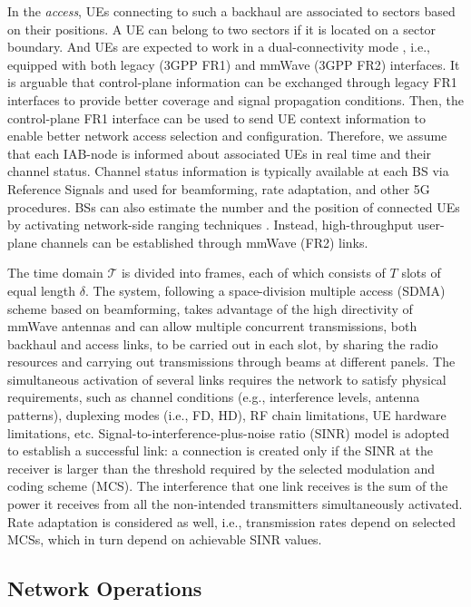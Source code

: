 In the \textit{access}, UEs connecting to such a backhaul are associated to sectors based on their positions. A UE can belong to two sectors if it is located on a sector boundary. And UEs are expected to work in a dual-connectivity mode \cite{polese2017improved}, i.e., equipped with both legacy (3GPP FR1) and mmWave (3GPP FR2) interfaces. It is arguable that control-plane information can be exchanged through legacy FR1 interfaces to provide better coverage and signal propagation conditions.
Then, the control-plane FR1 interface can be used to send UE context information to enable better network access selection and configuration.
Therefore, we assume that each IAB-node is informed about associated UEs in real time and their channel status. Channel status information is typically available at each BS via Reference Signals and used for beamforming, rate adaptation, and other 5G procedures. BSs can also estimate the number and the position of connected UEs by activating network-side ranging techniques \cite{bernazzoli20235g}.
Instead, high-throughput user-plane channels can be established through mmWave (FR2) links.

The time domain $\mathcal{T}$ is divided into frames, each of which consists of $T$ slots of equal length $\delta$. 
The system, following a space-division multiple access (SDMA) scheme based on beamforming, takes advantage of the high directivity of mmWave antennas and can allow multiple concurrent transmissions, both backhaul and access links, to be carried out in each slot, by sharing the radio resources and carrying out transmissions through beams at different panels.
The simultaneous activation of several links requires the network to satisfy physical requirements, such as channel conditions (e.g., interference levels, antenna patterns), duplexing modes (i.e., FD, HD), RF chain limitations, UE hardware limitations, etc.
Signal-to-interference-plus-noise ratio (SINR) model is adopted to establish a successful link: a connection is created only if the SINR at the receiver is larger than the threshold required by the selected modulation and coding scheme (MCS). The interference that one link receives is the sum of the power it receives from all the non-intended transmitters simultaneously activated. Rate adaptation is considered as well, i.e., transmission rates depend on selected MCSs, which in turn depend on achievable SINR values.

\subsection{Network Operations}
\label{network_operations}

